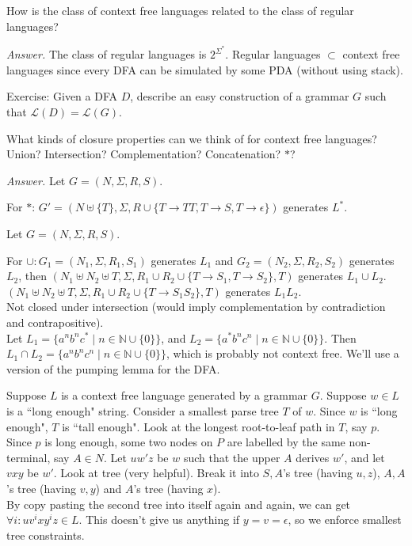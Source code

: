 \documentclass[a4paper]{article}
\newenvironment{ans}{\begin{breakbox}\textit{Answer.}}{\end{breakbox}}
\newcommand{\nl}{\vspace{0.2cm}\\}
\newcommand{\mc}{\mathcal}
\newcommand{\mb}{\mathbb}
\renewcommand{\L}{\mc{L}}
\begin{document}
\begin{ques}
    How is the class of context free languages related to the class of regular languages?
\end{ques}

\begin{ans}
    The class of regular languages is $2^{\Sigma^*}$. Regular languages $\subset$ context free languages since every DFA can be simulated by some PDA (without using stack).
\end{ans}

Exercise: Given a DFA $D$, describe an easy construction of a grammar $G$ such that $\L(D) = \L(G)$.

\begin{ques}
    What kinds of closure properties can we think of for context free languages? Union? Intersection? Complementation? Concatenation? $*$?
\end{ques}

\begin{ans}
    Let $G = (N, \Sigma, R, S)$.

    For $*$: $G' = (N \uplus \{T\}, \Sigma, R \cup \{T \to TT, T \to S, T \to \epsilon\})$ generates $L^*$.

    Let $G = (N, \Sigma, R, S)$.
    
    For $\cup: G_1 = (N_1, \Sigma, R_1, S_1)$ generates $L_1$ and $G_2 = (N_2, \Sigma, R_2, S_2)$ generates $L_2$, then
    $(N_1 \uplus N_2 \uplus T, \Sigma, R_1 \cup R_2 \cup \{T \to S_1, T \to S_2\}, T)$ generates $L_1 \cup L_2$.\nl
    $(N_1 \uplus N_2 \uplus T, \Sigma, R_1 \cup R_2 \cup \{T \to S_1 S_2\}, T)$ generates $L_1 L_2$.\nl

    Not closed under intersection (would imply complementation by contradiction and contrapositive).\nl

    Let $L_1 = \{a^nb^nc^* \mid n \in \mb{N} \cup \{0\}\}$, and $L_2 = \{a^*b^nc^n \mid n \in \mb{N} \cup \{0\}\}$. Then $L_1 \cap L_2 = \{a^nb^nc^n \mid n \in \mb{N} \cup \{0\}\}$, which is
    probably not context free. We'll use a version of the pumping lemma for the DFA.
\end{ans}

\begin{note}
    Suppose $L$ is a context free language generated by a grammar $G$. Suppose $w \in L$ is a ``long enough" string. Consider a smallest parse tree $T$ of $w$. Since $w$ is ``long enough", $T$ is ``tall
    enough". Look at the longest root-to-leaf path in $T$, say $p$.\nl
    Since $p$ is long enough, some two nodes on $P$ are labelled by the same non-terminal, say $A \in N$. Let $uw'z$ be $w$ such that the upper $A$ derives $w'$, and let $vxy$ be $w'$. Look at tree
    (very helpful). Break it into $S, A$'s tree (having $u, z$), $A, A$'s tree (having $v, y$) and $A$'s tree (having $x$).\nl
    By copy pasting the second tree into itself again and again, we can get $\forall i : uv^ixy^iz \in L$. This doesn't give us anything if $y = v = \epsilon$, so we enforce smallest tree
    constraints.
\end{note}
\end{document}

